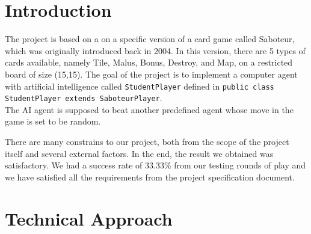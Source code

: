 \documentclass[12pt,twoside,letterpaper]{article}
\begin{document}

\tableofcontents
\newpage
\newpage

\section{Introduction}
The project is based on a on a specific version of a card game called Saboteur, which was originally introduced back in 2004. In this version, there are 5 types of cards available, namely Tile, Malus, Bonus, Destroy, and Map, on a  restricted board of size (15,15). The goal of the project is to implement a computer agent with artificial intelligence called \texttt{StudentPlayer} defined in \texttt{public class StudentPlayer extends SaboteurPlayer}. \\ The AI agent is supposed to beat another predefined agent whose move in the game is set to be random.
\par There are many constrains to our project, both from the scope of the project itself and several external factors. In the end, the result we obtained was satisfactory. We had a success rate of 33.33\% from our testing rounds of play and we have satisfied all the requirements from the project specification document.

\section{Technical Approach}
\end{document}
